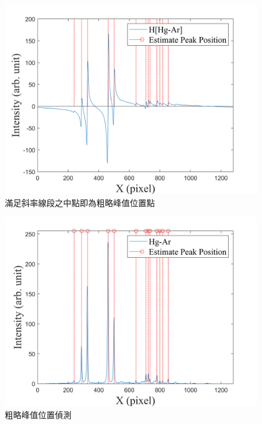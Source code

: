 \begin{figure}[H] %
	\centering %
	\includegraphics[width=14.5cm]{figures/estimate_peak_position.PNG} %
	\caption{滿足斜率線段之中點即為粗略峰值位置點} %
	\label{滿足斜率線段之中點即為粗略峰值位置點} %
\end{figure}
\begin{figure}[H] %
	\centering %
	\includegraphics[width=14.5cm]{figures/估測峰值位置.PNG} %
	\caption{粗略峰值位置偵測} %
	\label{粗略峰值位置偵測} %
\end{figure}
